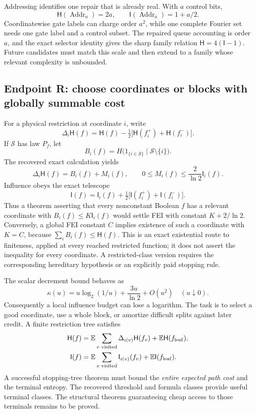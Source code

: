 \documentclass[11pt]{article}
\newcommand{\HH}{\mathsf H}\newcommand{\I}{\mathsf I}
\newcommand{\E}{\mathbb E}\newcommand{\Pp}{\mathbb P}
\begin{document}
Addressing identifies one repair that is already real. With $a$ control bits,
\[
 \HH(\operatorname{Addr}_a)=2a,\qquad
 \I(\operatorname{Addr}_a)=1+a/2.
\]
Coordinatewise gate labels can charge order $a^2$, while one complete Fourier set needs one gate label and a control subset. The repaired queue accounting is order $a$, and the exact selector identity gives the sharp family relation $\HH=4(\I-1)$. Future candidates must match this scale and then extend to a family whose relevant complexity is unbounded.

\subsection{Endpoint R: choose coordinates or blocks with globally summable cost}

For a physical restriction at coordinate $i$, write
\[
 \Delta_i\HH(f)=\HH(f)-\tfrac12\bigl[\HH(f_i^+)+\HH(f_i^-)\bigr].
\]
If $\mathcal S$ has law $P_f$, let
\[
 B_i(f)=H\bigl(1_{\{i\in\mathcal S\}}\mid\mathcal S\setminus\{i\}\bigr).
\]
The recovered exact calculation yields
\begin{equation}\label{eq:decrement}
 \Delta_i\HH(f)=B_i(f)+M_i(f),\qquad
 0\le M_i(f)\le\frac2{\ln2}\I_i(f).
\end{equation}
Influence obeys the exact telescope
\[
 \I(f)=\I_i(f)+\tfrac12\bigl[\I(f_i^+)+\I(f_i^-)\bigr].
\]
Thus a theorem asserting that every nonconstant Boolean $f$ has a relevant coordinate with $B_i(f)\le K\I_i(f)$ would settle FEI with constant $K+2/\ln2$. Conversely, a global FEI constant $C$ implies existence of such a coordinate with $K=C$, because $\sum_i B_i(f)\le\HH(f)$. This is an exact existential route to finiteness, applied at every reached restricted function; it does not assert the inequality for every coordinate. A restricted-class version requires the corresponding hereditary hypothesis or an explicitly paid stopping rule.

The scalar decrement bound behaves as
\[
 \kappa(u)=u\log_2(1/u)+\frac{3u}{\ln2}+O(u^2)
 \quad(u\downarrow0).
\]
Consequently a local influence budget can lose a logarithm. The task is to select a good coordinate, use a whole block, or amortize difficult splits against later credit. A finite restriction tree satisfies
\begin{align*}
 \HH(f)&=\E\sum_{v\text{ visited}}\Delta_{i(v)}\HH(f_v)
                +\E\HH(f_{\rm leaf}),\\
 \I(f)&=\E\sum_{v\text{ visited}}\I_{i(v)}(f_v)
                +\E\I(f_{\rm leaf}).
\end{align*}
A successful stopping-tree theorem must bound the \emph{entire expected path cost} and the terminal entropy. The recovered threshold and formula classes provide useful terminal classes. The structural theorem guaranteeing cheap access to those terminals remains to be proved.
\end{document}
